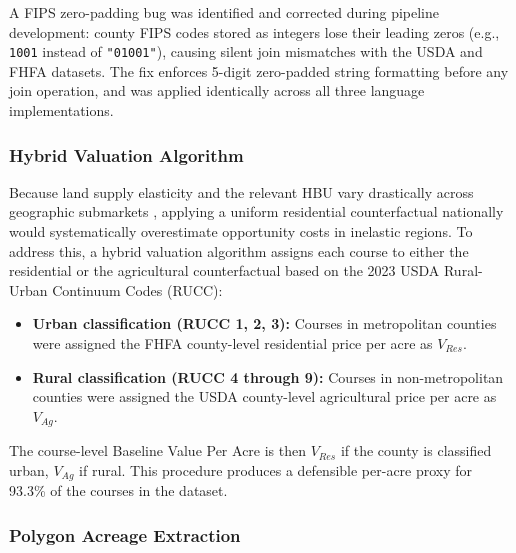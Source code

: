 \documentclass[11pt, letterpaper]{article}
\begin{document}
A FIPS zero-padding bug was identified and corrected during pipeline development: county FIPS codes stored as integers lose their leading zeros (e.g., \texttt{1001} instead of \texttt{"01001"}), causing silent join mismatches with the USDA and FHFA datasets. The fix enforces 5-digit zero-padded string formatting before any join operation, and was applied identically across all three language implementations.

\subsubsection{Hybrid Valuation Algorithm}

Because land supply elasticity and the relevant HBU vary drastically across geographic submarkets \parencite{Davis2008}, applying a uniform residential counterfactual nationally would systematically overestimate opportunity costs in inelastic regions. To address this, a hybrid valuation algorithm assigns each course to either the residential or the agricultural counterfactual based on the 2023 USDA Rural-Urban Continuum Codes (RUCC):

\begin{itemize}[leftmargin=*]
    \item \textbf{Urban classification (RUCC 1, 2, 3):} Courses in metropolitan counties were assigned the FHFA county-level residential price per acre as $V_{Res}$.
    \item \textbf{Rural classification (RUCC 4 through 9):} Courses in non-metropolitan counties were assigned the USDA county-level agricultural price per acre as $V_{Ag}$.
\end{itemize}

\noindent The course-level Baseline Value Per Acre is then $V_{Res}$ if the county is classified urban, $V_{Ag}$ if rural. This procedure produces a defensible per-acre proxy for 93.3\% of the courses in the dataset.

\subsubsection{Polygon Acreage Extraction}
\end{document}
